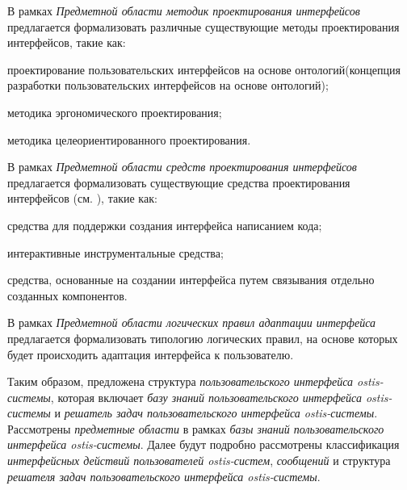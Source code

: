 \bigskip

В рамках \textit{Предметной области методик проектирования интерфейсов} предлагается формализовать различные существующие методы проектирования интерфейсов, такие как:
\begin{textitemize}
	\item проектирование пользовательских интерфейсов на основе онтологий(концепция разработки пользовательских интерфейсов на основе онтологий);
	\item методика эргономического проектирования;
	\item методика целеориентированного проектирования.
\end{textitemize}

В рамках \textit{Предметной области средств проектирования интерфейсов} предлагается формализовать существующие средства проектирования интерфейсов (см. ), такие как:
\begin{textitemize}
	\item средства для поддержки создания интерфейса написанием кода;
	\item интерактивные инструментальные средства;
	\item средства, основанные на создании интерфейса путем связывания отдельно созданных компонентов.
\end{textitemize}

В рамках \textit{Предметной области логических правил адаптации интерфейса} предлагается формализовать типологию логических правил, на основе которых будет происходить адаптация интерфейса к пользователю.

Таким образом, предложена структура \textit{пользовательского интерфейса ostis-системы}, которая включает \textit{базу знаний пользовательского интерфейса ostis-системы} и \textit{решатель задач пользовательского интерфейса ostis-системы}. Рассмотрены \textit{предметные области} в рамках \textit{базы знаний пользовательского интерфейса ostis-системы}. Далее будут подробно рассмотрены классификация \textit{интерфейсных действий пользователей ostis-систем}, \textit{сообщений} и структура \textit{решателя задач пользовательского интерфейса ostis-системы}.


